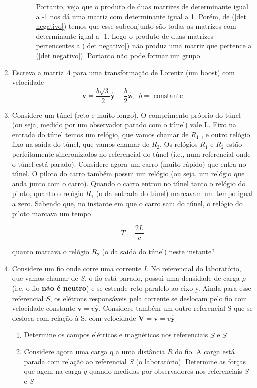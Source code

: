 \documentclass[10pt,a4paper]{article}
\begin{document}
\begin{enumerate}
\begin{enumerate}
\begin{enumerate}
	Portanto, veja que o produto de duas matrizes de determinante igual a -1 nos dá uma matriz com determinante igual a 1. Porém, de (\ref{det negativo}) temos que esse subconjunto são todas as matrizes com determinante igual a -1. Logo o produto de duas matrizes pertencentes a (\ref{det negativo}) não produz uma matriz que pertence a (\ref{det negativo}). Portanto não pode formar um grupo.
	\end{enumerate}
	\end{enumerate}
	
	\item Escreva a matriz $\Lambda$ para uma transformação de Lorentz (um boost) com velocidade 
	\begin{equation}
	\mathbf{v} = \frac{b\sqrt{3}}{2}\mathbf{\hat{y}}-\frac{b}{2}\mathbf{\hat{z}}, \;\; b = \text{ constante}
	\end{equation}
	
	\item Considere um túnel (reto e muito longo). O comprimento próprio do túnel (ou seja, medido por um observador parado com o túnel) vale L. Fixo na entrada do túnel temos um relógio, que vamos chamar de $R_1$ , e outro relógio fixo na saída do túnel, que vamos chamar de $R_2$. Os relógios $R_1$ e $R_2$ estão perfeitamente sincronizados no referencial do túnel (i.e., num referencial onde o túnel está parado). Considere agora um carro (muito rápido) que entra no túnel. O piloto do carro também possui um relógio (ou seja, um relógio que anda junto com o carro). Quando o carro entrou no túnel tanto o relógio do piloto, quanto o relógio $R_1$ (o da entrada do túnel) marcavam um tempo igual a zero. Sabendo que, no instante em que o carro saiu do túnel, o relógio do piloto marcava um tempo
	
	\begin{equation}
	T = \frac{2L}{c}
	\end{equation}
	
	quanto marcava o relógio $R_2$ (o da saída do túnel) neste instante?
	
	\item Considere um fio onde corre uma corrente $I$. No referencial do laboratório, que vamos chamar de $S$, o fio está parado, possui uma densidade de carga $\rho$ (i.e, o fio \textbf{não é neutro}) e se estende reto paralelo ao eixo y. Ainda para esse referencial $S$, os elétrons responsáveis pela corrente se deslocam pelo fio com velocidade constante $\mathbf{v} =v \mathbf{\hat{y}}$. Considere também um outro referencial S que se desloca com relação à S, com velocidade $\mathbf{V} = \mathbf{v} = v\mathbf{\hat{y}}$
	\begin{enumerate}
	\item Determine os campos elétricos e magnéticos nos referenciais $S$ e $\tilde{S}$
	
	\item Considere agora uma carga q a uma distância $R$ do fio. A carga está parada com relação ao referencial $S$ (o laboratório). Determine as forças que agem na carga $q$ quando medidas por observadores nos referenciais $S$ e $\tilde{S}$
	\end{enumerate}
	\end{enumerate}
\end{document}
